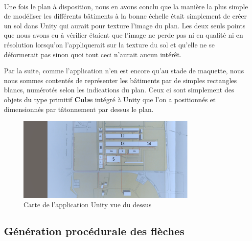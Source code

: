 \paragraph{} \hspace{10mm}
Une fois le plan à disposition, nous en avons conclu que la manière la plus simple de modéliser les différents bâtiments à la bonne échelle était simplement de créer un sol dans Unity qui aurait pour texture l'image du plan. Les deux seuls points que nous avons eu à vérifier étaient que l'image ne perde pas ni en qualité ni en résolution lorsqu'on l'appliquerait sur la texture du sol et qu'elle ne se déformerait pas sinon quoi tout ceci n'aurait aucun intérêt.

Par la suite, comme l'application n'en est encore qu'au stade de maquette, nous nous sommes contentés de représenter les bâtiments par de simples rectangles blancs, numérotés selon les indications du plan. Ceux ci sont simplement des objets du type primitif \textbf{Cube} intégré à Unity que l'on a positionnés et dimensionnés par tâtonnement par dessus le plan.

\begin{figure} [H]
    \centering
    \includegraphics[width=0.79\textwidth]{assets/unity/screen_unity_map.png}
    \caption{Carte de l'application Unity vue du dessus}
    \label{fig:unityMap}
\end{figure}

\subsection{Génération procédurale des flèches}

